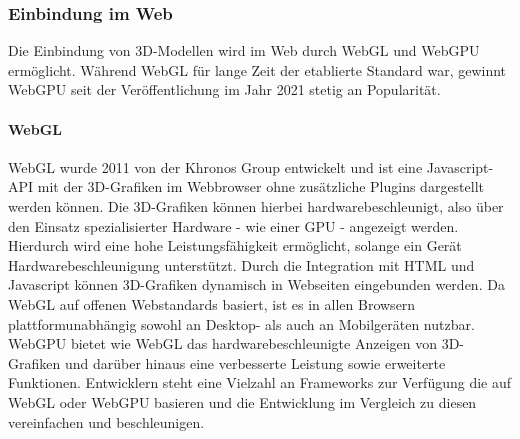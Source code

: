 \subsubsection{Einbindung im Web}
Die Einbindung von 3D-Modellen wird im Web durch \ac{WebGL} und WebGPU ermöglicht. Während \ac{WebGL} für lange Zeit der etablierte Standard war, gewinnt WebGPU seit der Veröffentlichung im Jahr 2021 stetig an Popularität.

\paragraph{WebGL}
\ac{WebGL} wurde 2011 von der Khronos Group entwickelt und ist eine Javascript-API mit der 3D-Grafiken im Webbrowser ohne zusätzliche Plugins dargestellt werden können. Die 3D-Grafiken können hierbei hardwarebeschleunigt, also über den Einsatz spezialisierter Hardware - wie einer \ac{GPU} - angezeigt werden. Hierdurch wird eine hohe Leistungsfähigkeit ermöglicht, solange ein Gerät Hardwarebeschleunigung unterstützt. Durch die Integration mit HTML und Javascript können 3D-Grafiken dynamisch in Webseiten eingebunden werden. Da \ac{WebGL} auf offenen Webstandards basiert, ist es in allen Browsern plattformunabhängig sowohl an Desktop- als auch an Mobilgeräten nutzbar.\cite[S.~17-19]{Parisi2014} WebGPU bietet wie WebGL das hardwarebeschleunigte Anzeigen von 3D-Grafiken und darüber hinaus eine verbesserte Leistung sowie erweiterte Funktionen\cite{Surma2022}. Entwicklern steht eine Vielzahl an Frameworks zur Verfügung die auf \ac{WebGL} oder WebGPU basieren\cite{Seguin2024} und die Entwicklung im Vergleich zu diesen vereinfachen und beschleunigen.

